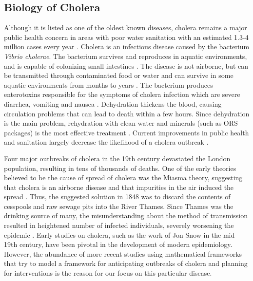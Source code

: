 \documentclass[12pt]{article}\usepackage[]{graphicx}\usepackage[]{color}
\begin{document}
\subsection{Biology of Cholera}
Although it is listed as one of the oldest known diseases, cholera remains a major public health concern in areas with poor water sanitation with an estimated 1.3-4 million cases every year \citep{link18}.
Cholera is an infectious disease caused by the bacterium \textit{Vibrio cholerae}.
The bacterium survives and reproduces in aquatic environments, and is capable of colonizing small intestines \citep{link8}.
The disease is not airborne, but can be transmitted through contaminated food or water and can survive in some aquatic environments from months to years \citep{link9}.
The bacterium produces enterotoxins responsible for the symptoms of cholera infection which are severe diarrhea, vomiting and nausea \citep{link11}.
Dehydration thickens the blood, causing circulation problems that can lead to death within a few hours.
Since dehydration is the main problem, rehydration with clean water and minerals (such as ORS packages) is the most effective treatment \citep{link18}.
Current improvements in public health and sanitation largely decrease the likelihood of a cholera outbreak \citep{link18}.\par
Four major outbreaks of cholera in the 19th century devastated the London population, resulting in tens of thousands of deaths.
One of the early theories believed to be the cause of spread of cholera was the Miasma theory, suggesting that cholera is an airborne disease and that impurities in the air induced the spread \citep{link1}.
Thus, the suggested solution in 1848 was to discard the contents of cesspools and raw sewage pits into the River Thames.
Since Thames was the drinking source of many, the misunderstanding about the method of transmission resulted in heightened number of infected individuals, severely worsening the epidemic \citep{link1}.
Early studies on cholera, such as the work of Jon Snow in the mid 19th century, have been pivotal in the development of modern epidemiology.
However, the abundance of more recent studies using mathematical frameworks that try to model a framework for anticipating outbreaks of cholera and planning for interventions is the reason for our focus on this particular disease.
\end{document}

